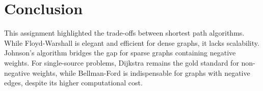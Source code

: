 \documentclass[12pt, a4paper]{article}
\begin{document}
\section{Conclusion}
This assignment highlighted the trade-offs between shortest path algorithms. While Floyd-Warshall is elegant and efficient for dense graphs, it lacks scalability. Johnson’s algorithm bridges the gap for sparse graphs containing negative weights. For single-source problems, Dijkstra remains the gold standard for non-negative weights, while Bellman-Ford is indispensable for graphs with negative edges, despite its higher computational cost.
\end{document}
